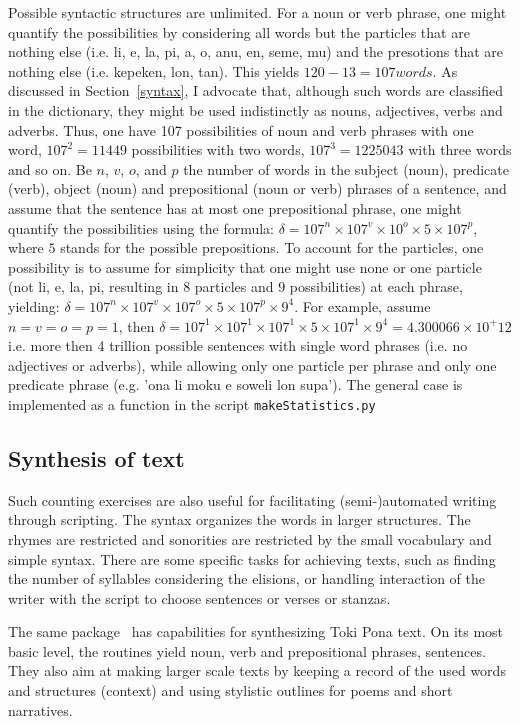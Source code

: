 \documentclass{article}
\newcommand{\tttt}[1]{\texttt{#1}}
\begin{document}
Possible syntactic structures are unlimited.
For a noun or verb phrase, one might quantify the possibilities
by considering all words but the particles that are nothing else
(i.e. li, e, la, pi, a, o, anu, en, seme, mu)
and the presotions that are nothing else (i.e. kepeken, lon, tan).
This yields $120-13=107 words$.
As discussed in Section~\ref{syntax},
I advocate that, although such words are classified in the dictionary,
they might be used indistinctly as nouns, adjectives,
verbs and adverbs.
Thus, one have 107 possibilities of noun and verb phrases with
one word, $107^2=11449$ possibilities with two words,
$107^3=1225043$ with three words and so on.
Be $n$, $v$, $o$, and $p$ the number of words in the subject (noun), predicate
(verb), object (noun) and prepositional (noun or verb) phrases of a sentence,
and assume that the sentence has at most one prepositional phrase,
one might quantify the possibilities using the formula:
$\delta = 107^n\times 107^v\times 10^o \times 5\times 107^p$,
where $5$ stands for the possible prepositions.
To account for the particles, one possibility is
to assume for simplicity that one might use none or one particle
(not li, e, la, pi, resulting in $8$ particles and $9$ possibilities)
at each phrase, yielding:
$\delta = 107^n\times 107^v\times 107^o \times 5\times 107^p\times 9^4$.
For example, assume $n=v=o=p=1$, then
$\delta=107^1\times 107^1\times 107^1 \times 5\times 107^1\times 9^4=
 4.300066\times 10^+12$
i.e. more then 4 trillion possible
sentences with single word phrases (i.e. no adjectives or adverbs),
while allowing only one particle per phrase
and only one predicate phrase 
(e.g. 'ona li moku e soweli lon supa').
The general case is implemented as a function
in the script \tttt{makeStatistics.py}~\cite{tokipona}

\subsection{Synthesis of text}\label{synth}
Such counting exercises are also useful
for facilitating (semi-)automated writing through scripting.
The syntax organizes the words in larger structures.
The rhymes are restricted and sonorities are
restricted by the small vocabulary and simple syntax.
There are some specific tasks for achieving texts,
such as finding the number of syllables considering the elisions,
or handling interaction of the writer with the script
to choose sentences or verses or stanzas.

The same package~\cite{tokipona}
has capabilities for synthesizing Toki Pona text.
On its most basic level, the routines yield
noun, verb and prepositional phrases,
sentences.
They also aim at making larger scale texts
by keeping a record of the used words and structures (context)
and using stylistic outlines for poems and short narratives.
\end{document}

